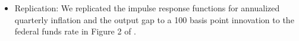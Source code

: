 \documentclass[11pt,a4paper]{article}
\begin{document}
\begin{itemize}
		\item Replication: We replicated the impulse response functions for annualized quarterly inflation and the output gap to a 100 basis point innovation to the federal funds rate in Figure 2 of \cite{LevinWielandWilliams2003}.
	\end{itemize}
	
	
\end{document}
